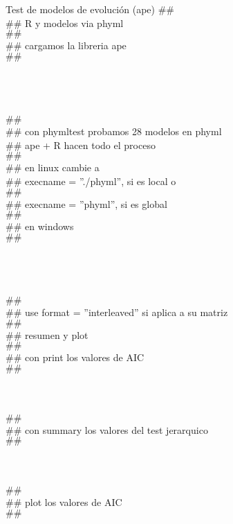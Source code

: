 {Test de modelos de evoluci\'on (ape)}
\label{sec:phytest}
\noindent
$\#\#$
\\$\#\#$ R y modelos via phyml 
\\$\#\#$
\\$\#\#$ cargamos la libreria ape
\\$\#\#$\\
\\
\\
\\
\\$\#\#$
\\$\#\#$  con phymltest probamos 28 modelos en phyml
\\$\#\#$  ape + R hacen todo el proceso
\\$\#\#$
\\$\#\#$  en linux cambie a
\\$\#\#$  execname = ''./phyml'', si es local o
\\$\#\#$
\\$\#\#$  execname = ''phyml'', si es global
\\$\#\#$
\\$\#\#$ en windows
\\$\#\#$ \\
\\
\\
\\
\\$\#\#$  
\\$\#\#$  use format = ''interleaved'' si aplica a su matriz 
\\$\#\#$
\\$\#\#$ resumen y plot 
\\$\#\#$ 
\\$\#\#$ con print los valores de AIC
\\$\#\#$ \\
\\
\\
\\$\#\#$ 
\\$\#\#$  con summary los valores del test jerarquico
\\$\#\#$ \\
\\
\\
\\$\#\#$ 
\\$\#\#$ plot los valores de AIC
\\$\#\#$ \\
\\
\\
